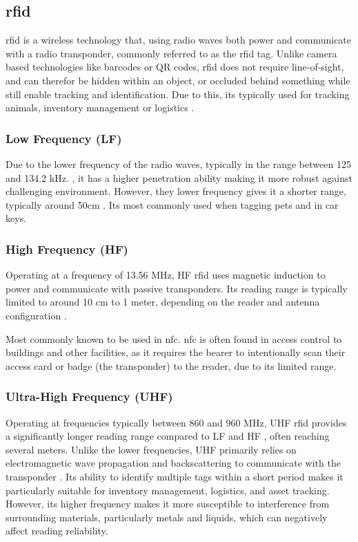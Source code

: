 \subsection{\gls{rfid}}
\acrfull{rfid} is a wireless technology that, using radio waves both power and communicate with a radio transponder, commonly referred to as the \acrshort{rfid} tag. Unlike camera based technologies like barcodes or QR codes, \acrshort{rfid} does not require line-of-sight, and can therefor be hidden within an object, or occluded behind something while still enable tracking and identification. Due to this, its typically used for tracking animals, inventory management or logistics \cite{identification-to-sensing}.

\subsubsection{Low Frequency (LF)} 
Due to the lower frequency of the radio waves, typically in the range between 125 and 134.2 kHz. \cite{identification-to-sensing}, it has a higher penetration ability making it more robust against challenging environment. However, they lower frequency gives it a shorter range, typically around 50cm \cite{identification-to-sensing}. Its most commonly used when tagging pets and in car keys.

\subsubsection{High Frequency (HF)}
Operating at a frequency of 13.56 MHz, HF \acrshort{rfid} uses magnetic induction to power and communicate with passive transponders. Its reading range is typically limited to around 10 cm to 1 meter, depending on the reader and antenna configuration \cite{identification-to-sensing}.

Most commonly known to be used in \acrfull{nfc}. \acrshort{nfc} is often found in access control to buildings and other facilities, as it requires the bearer to intentionally scan their access card or badge (the transponder) to the reader, due to its limited range. 

\subsubsection{Ultra-High Frequency (UHF)}
Operating at frequencies typically between 860 and 960 MHz, UHF \acrshort{rfid} provides a significantly longer reading range compared to LF and HF \cite{identification-to-sensing}, often reaching several meters. Unlike the lower frequencies, UHF primarily relies on electromagnetic wave propagation and backscattering to communicate with the transponder \cite{rfid-sensing-techniques}. Its ability to identify multiple tags within a short period makes it particularly suitable for inventory management, logistics, and asset tracking. However, its higher frequency makes it more susceptible to interference from surrounding materials, particularly metals and liquids, which can negatively affect reading reliability.

